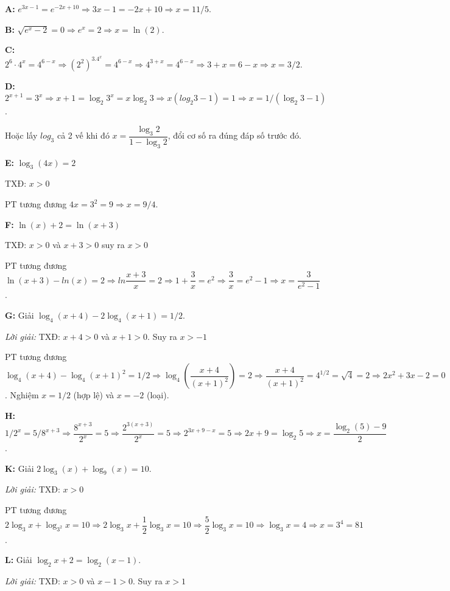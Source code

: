 \documentclass[12pt,a4paper]{article}
\begin{document}
\textbf{A:} $e^{3x-1} = e^{-2x+10} \Rightarrow 3x-1=-2x+10 \Rightarrow x = 11/5$.

\textbf{B:} $\sqrt{e^x-2} = 0 \Rightarrow e^x = 2 \Rightarrow x = \ln(2)$.

\textbf{C:} $2^6 \cdot 4^x = 4^{6-x} \Rightarrow (2^2)^3.4^x = 4^{6 - x} \Rightarrow 4^{3 + x} = 4^{6 - x} \Rightarrow 3 + x = 6 - x \Rightarrow x = 3/2$.

\textbf{D:} $2^{x+1} = 3^x \Rightarrow x + 1 = \log_2{3^x} = x \log_2{3} \Rightarrow x (log_2{3} - 1) = 1 \Rightarrow x = 1/(\log_2{3}-1)$.

Hoặc lấy $log_3$ cả 2 vế khi đó $x = \dfrac{\log_3{2}}{1 - \log_3{2}}$, đổi cơ số ra đúng đáp số trước đó.

\textbf{E:} $\log_3(4x) = 2$

TXĐ: $x > 0$

PT tương đương $4x = 3^2 = 9 \Rightarrow x = 9/4$.

\textbf{F:} $\ln(x) + 2 = \ln(x+3)$

TXĐ: $x > 0$ và $x + 3 > 0$ suy ra $x > 0$

PT tương đương $\ln (x + 3) - ln (x) = 2 \Rightarrow ln \dfrac{x + 3}{x} = 2 \Rightarrow 1 + \dfrac{3}{x} = e^2 \Rightarrow \dfrac{3}{x} = e^2 - 1 \Rightarrow x = \dfrac{3}{e^2-1}$.

\textbf{G:} Giải $\log_4(x+4) - 2\log_4(x+1) = 1/2$.

\textit{Lời giải:} TXĐ: $x + 4 > 0$ và $x + 1 > 0$. Suy ra $x > -1$

PT tương đương  $\log_4(x+4) - \log_4(x+1)^2 = 1/2 \Rightarrow \log_4\!\left(\dfrac{x+4}{(x+1)^2}\right) = 2 \Rightarrow \dfrac{x+4}{(x+1)^2} = 4^{1/2} = \sqrt{4} = 2 \Rightarrow 2x^2+3x-2=0$.
Nghiệm $x=1/2$ (hợp lệ) và $x=-2$ (loại).

\textbf{H:} $1/2^x = 5/8^{x+3} \Rightarrow \dfrac{8^{x + 3}}{2^x} = 5 \Rightarrow \dfrac{2^{3(x + 3)}}{2^x} = 5 \Rightarrow 2^{3x + 9 - x} = 5 \Rightarrow 2x + 9 = \log_2{5} \Rightarrow x = \dfrac{\log_2(5)-9}{2}$.

\textbf{K:} Giải $2\log_3(x) + \log_9(x) = 10$.

\textit{Lời giải:} TXĐ: $x > 0$

PT tương đương $2\log_3{x} + \log_{3^2}{x} = 10 \Rightarrow 2\log_3{x} + \dfrac{1}{2}\log_{3}{x} = 10 \Rightarrow \dfrac{5}{2}\log_3{x} = 10 \Rightarrow \log_3{x} = 4 \Rightarrow x = 3^{4} = 81$.

\textbf{L:} Giải $\log_2 x + 2 = \log_2(x-1)$.

\textit{Lời giải:} TXĐ: $x > 0$ và $x - 1 > 0$. Suy ra $x > 1$
\end{document}

